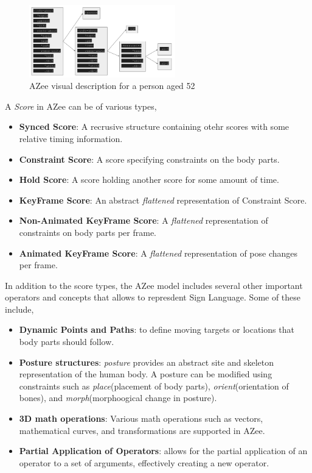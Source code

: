 \documentclass[../../main.tex]{subfiles}
\begin{document}
\begin{figure}[h]
  \centering \includegraphics[width = 2.5in]{chapters/background_work/images/azee_score_example.png}
  \caption{AZee visual description for a person aged 52}
  \label{fig:azee_score_example}
\end{figure}

A \emph{Score} in AZee can be of various types,

\begin{itemize}
  \item \textbf{Synced Score}: A recrusive structure containing otehr scores with some relative timing information.
  \item \textbf{Constraint Score}: A score specifying constraints on the body parts.
  \item \textbf{Hold Score}: A score holding another score for some amount of time.
  \item \textbf{KeyFrame Score}: An abstract \emph{flattened} representation of Constraint Score.
  \item \textbf{Non-Animated KeyFrame Score}: A \emph{flattened} representation of constraints on body parts per frame.
  \item \textbf{Animated KeyFrame Score}: A \emph{flattened} representation of pose changes per frame.
\end{itemize}

In addition to the score types, the AZee model includes several other important operators and concepts that allows to represdent Sign Language. Some of these include,

\begin{itemize}
  \item \textbf{Dynamic Points and Paths}: to define moving targets or locations that body parts should follow.
  \item \textbf{Posture structures}: \emph{posture} provides an abstract site and skeleton representation of the human body. A posture can be modified using constraints such as \emph{place}(placement of body parts), \emph{orient}(orientation of bones), and \emph{morph}(morphoogical change in posture).
  \item \textbf{3D math operations}: Various math operations such as vectors, mathematical curves, and transformations are supported in AZee.
  \item \textbf{Partial Application of Operators}: allows for the partial application of an operator to a set of arguments, effectively creating a new operator.
\end{itemize}
\end{document}
